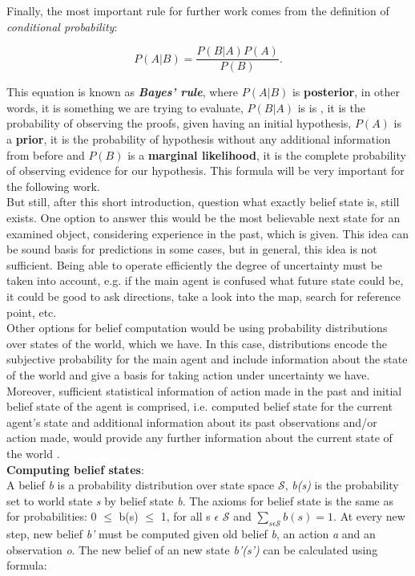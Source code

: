 Finally, the most important rule for further work comes from the definition of \textit{conditional probability}:

\begin{equation}
P(A|B)=\frac{P(B|A)P(A)}{P(B)}.
\end{equation}

This equation is known as \textbf{\textit{Bayes’ rule}}, where $P(A|B)$ is \textbf{posterior}, in other words, it is something we are trying to evaluate, $P(B|A)$ is is , it is the probability of observing the proofs, given having an initial hypothesis, $P(A)$ is a \textbf{prior}, it is the probability of hypothesis without any additional information from before and $P(B)$ is a \textbf{marginal likelihood}, it is the complete probability of observing evidence for our hypothesis. This formula will be very important for the following work. \\
But still, after this short introduction, question what exactly belief state is, still exists. One option to answer this would be the most believable next state for an examined object, considering experience in the past, which is given. This idea can be sound basis for predictions in some cases, but in general, this idea is not sufficient. Being able to operate efficiently the degree of uncertainty must be taken into account, e.g. if the main agent is confused what future state could be, it could be good to ask directions, take a look into the map, search for reference point, etc. \\
Other options for belief computation would be using probability distributions over states of the world, which we have. In this case, distributions encode the subjective probability for the main agent and include information about the state of the world and give a basis for taking action under uncertainty we have.  Moreover, sufficient statistical information of action made in the past and initial belief state of the agent is comprised, i.e. computed belief state for the current agent’s state and additional information about its past observations and/or action made, would provide any further information about the current state of the world \cite{belief}. \\
\textbf{Computing belief states}\cite{belief}: \\
A belief \textit{b} is a probability distribution over state space $\mathscr{S}$, \textit{b(s)} is the probability set to world state \textit{s} by belief state \textit{b}. The axioms for belief state is the same as for probabilities: 0 $\leqslant$ b(s) $\leqslant$ 1, for all s $\epsilon$ $\mathscr{S}$ and $\sum_{s \epsilon \mathscr{S} } b(s) = 1.$ At every new step, new belief \textit{b'} must be  computed given old belief \textit{b}, an action \textit{a} and an observation \textit{o}. The new belief of an new state \textit{b'(s')} can be calculated using formula:

